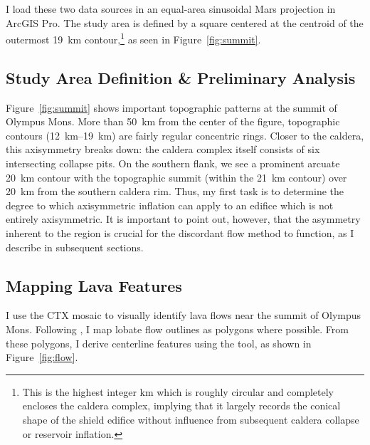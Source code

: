 I load these two data sources in an equal-area sinusoidal Mars projection in ArcGIS Pro. The study area is defined by a square  centered at the centroid of the outermost \qty{19}{\km} contour,\footnote{This is the highest integer \unit{km} which is roughly circular and completely encloses the caldera complex, implying that it largely records the conical shape of the shield edifice without influence from subsequent caldera collapse or reservoir inflation.} as seen in Figure~\ref{fig:summit}.

\subsection{Study Area Definition \& Preliminary Analysis}

Figure~\ref{fig:summit} shows important topographic patterns at the summit of Olympus Mons. More than \qty{50}{\km} from the center of the figure, topographic contours (\qtyrange{12}{19}{\km}) are fairly regular concentric rings. Closer to the caldera, this axisymmetry breaks down: the caldera complex itself consists of six intersecting collapse pits. On the southern flank, we see a prominent arcuate \qty{20}{\km} contour with the topographic summit (within the \qty{21}{\km} contour) over \qty{20}{\km} from the southern caldera rim. Thus, my first task is to determine the degree to which axisymmetric inflation can apply to an edifice which is not entirely axisymmetric. It is important to point out, however, that the asymmetry inherent to the region is crucial for the discordant flow method to function, as I describe in subsequent sections. 


\subsection{Mapping Lava Features}

I use the \ac{CTX} mosaic to visually identify lava flows near the summit of Olympus Mons. Following \textcite{mouginis-mark_geologic_2021}, I map lobate flow outlines as polygons where possible. From these polygons, I derive centerline features using the  tool, as shown in Figure~\ref{fig:flow}.

